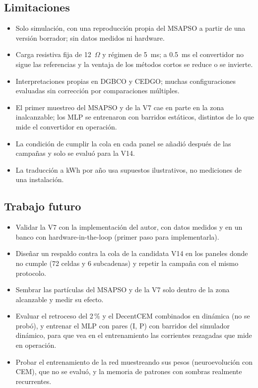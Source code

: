 \documentclass[letterpaper,11pt]{article}
\begin{document}
\subsection{Limitaciones}
\begin{itemize}[leftmargin=1.5em, itemsep=2pt]
  \item Solo simulación, con una reproducción propia del MSAPSO a partir de una versión borrador; sin datos medidos ni hardware.
  \item Carga resistiva fija de 12~$\Omega$ y régimen de 5~ms; a 0.5~ms el convertidor no sigue las referencias y la ventaja de los métodos cortos se reduce o se invierte.
  \item Interpretaciones propias en DGBCO y CEDGO; muchas configuraciones evaluadas sin corrección por comparaciones múltiples.
  \item El primer muestreo del MSAPSO y de la V7 cae en parte en la zona inalcanzable; los MLP se entrenaron con barridos estáticos, distintos de lo que mide el convertidor en operación.
  \item La condición de cumplir la cola en cada panel se añadió después de las campañas y solo se evaluó para la V14.
  \item La traducción a kWh por año usa supuestos ilustrativos, no mediciones de una instalación.
\end{itemize}

\subsection{Trabajo futuro}
\begin{itemize}[leftmargin=1.5em, itemsep=2pt]
  \item Validar la V7 con la implementación del autor, con datos medidos y en un banco con hardware-in-the-loop (primer paso para implementarla).
  \item Diseñar un respaldo contra la cola de la candidata V14 en los paneles donde no cumple (72 celdas y 6 subcadenas) y repetir la campaña con el mismo protocolo.
  \item Sembrar las partículas del MSAPSO y de la V7 solo dentro de la zona alcanzable y medir su efecto.
  \item Evaluar el retroceso del 2\,\% y el DecentCEM combinados en dinámica (no se probó), y entrenar el MLP con pares (I, P) con barridos del simulador dinámico, para que vea en el entrenamiento las corrientes rezagadas que mide en operación.
  \item Probar el entrenamiento de la red muestreando sus pesos (neuroevolución con CEM), que no se evaluó, y la memoria de patrones con sombras realmente recurrentes.
\end{itemize}
\end{document}
